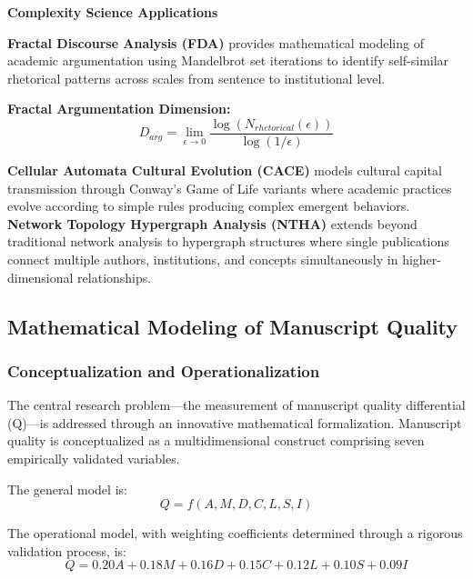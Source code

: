 \documentclass[journal,article,submit,pdftex,moreauthors]{Definitions/mdpi}
\begin{document}
\textbf{Complexity Science Applications}

\textbf{Fractal Discourse Analysis (FDA)} provides mathematical modeling of academic argumentation using Mandelbrot set iterations to identify self-similar rhetorical patterns across scales from sentence to institutional level.

\textbf{Fractal Argumentation Dimension:}
\begin{equation}
D_{arg} = \lim_{\epsilon \to 0} \frac{\log(N_{rhetorical}(\epsilon))}{\log(1/\epsilon)}
\end{equation}

\textbf{Cellular Automata Cultural Evolution (CACE)} models cultural capital transmission through Conway's Game of Life variants where academic practices evolve according to simple rules producing complex emergent behaviors. \textbf{Network Topology Hypergraph Analysis (NTHA)} extends beyond traditional network analysis to hypergraph structures where single publications connect multiple authors, institutions, and concepts simultaneously in higher-dimensional relationships.

\subsection{Mathematical Modeling of Manuscript Quality}

\subsubsection{Conceptualization and Operationalization}

The central research problem—the measurement of manuscript quality differential (Q)—is addressed through an innovative mathematical formalization. Manuscript quality is conceptualized as a multidimensional construct comprising seven empirically validated variables.

The general model is:
\begin{equation}
Q = f(A, M, D, C, L, S, I)
\end{equation}

The operational model, with weighting coefficients determined through a rigorous validation process, is:
\begin{equation}
Q = 0.20A + 0.18M + 0.16D + 0.15C + 0.12L + 0.10S + 0.09I
\end{equation}
\end{document}

